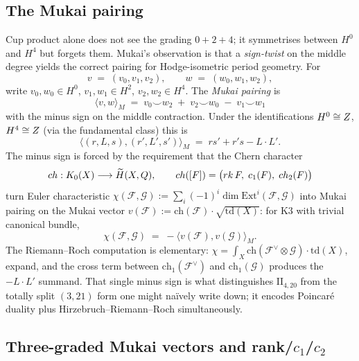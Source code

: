 \subsection{The Mukai pairing}

Cup product alone does not see the grading $0 + 2 + 4$; it symmetrises between $H^0$ and $H^4$ but forgets them. Mukai's observation is that a \emph{sign-twist} on the middle degree yields the correct pairing for Hodge-isometric period geometry. For
\[
  v \;=\; (v_0, v_1, v_2), \qquad w \;=\; (w_0, w_1, w_2),
\]
write $v_0, w_0 \in H^0$, $v_1, w_1 \in H^2$, $v_2, w_2 \in H^4$. The \emph{Mukai pairing} is
\begin{equation}
  \langle v, w\rangle_M \;=\; v_0 \smile w_2 \;+\; v_2 \smile w_0 \;-\; v_1 \smile w_1
  \label{eq:mukai-pairing}
\end{equation}
with the minus sign on the middle contraction. Under the identifications $H^0 \cong Z$, $H^4 \cong Z$ (via the fundamental class) this is
\[
  \langle (r, L, s), (r', L', s')\rangle_M \;=\; r s' + r' s - L \cdot L'.
\]
The minus sign is forced by the requirement that the Chern character
\[
  ch: K_0(X) \longrightarrow \widetilde H(X, Q),
  \qquad
  ch([F]) = \bigl(rk\, F, \; c_1(F), \; ch_2(F)\bigr)
\]
turn Euler characteristic $\chi(\mathcal F, \mathcal G) := \sum_i (-1)^i \dim \mathrm{Ext}^i(\mathcal F, \mathcal G)$ into Mukai pairing on the Mukai vector $v(\mathcal F) := \mathrm{ch}(\mathcal F) \cdot \sqrt{\mathrm{td}(X)}$: for K3 with trivial canonical bundle,
\[
  \chi(\mathcal F, \mathcal G) \;=\; -\langle v(\mathcal F), v(\mathcal G)\rangle_M.
\]
The Riemann--Roch computation is elementary: $\chi = \int_X \mathrm{ch}(\mathcal F^\vee \otimes \mathcal G) \cdot \mathrm{td}(X)$, expand, and the cross term between $\mathrm{ch}_1(\mathcal F^\vee)$ and $\mathrm{ch}_1(\mathcal G)$ produces the $-L \cdot L'$ summand. That single minus sign is what distinguishes $\mathrm{II}_{4, 20}$ from the totally split $(3, 21)$ form one might na\"ively write down; it encodes Poincar\'e duality plus Hirzebruch--Riemann--Roch simultaneously.

\subsection{Three-graded Mukai vectors and rank/$c_1$/$c_2$}

